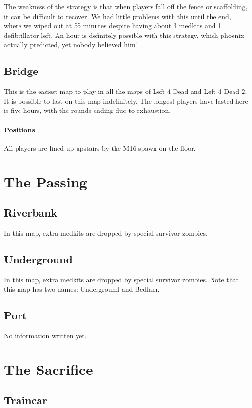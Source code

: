 The weakness of the strategy is that when players fall off the fence or scaffolding, it can be difficult to recover. We had little problems with this until the end, where we wiped out at 55 minutes despite having about 3 medkits and 1 defibrillator left. An hour is definitely possible with this strategy, which phoenix actually predicted, yet nobody believed him!

\subsection{Bridge}
This is the easiest map to play in all the maps of Left 4 Dead and Left 4 Dead 2. It is possible to last on this map indefinitely. The longest players have lasted here is five hours, with the rounds ending due to exhaustion.
\paragraph{Positions}
All players are lined up upstairs by the M16 spawn on the floor.

\section{The Passing}

\subsection{Riverbank}
In this map, extra medkits are dropped by special survivor zombies.

\subsection{Underground}
In this map, extra medkits are dropped by special survivor zombies. Note that this map has two names: Underground and Bedlam.

\subsection{Port}
No information written yet.

\section{The Sacrifice}

\subsection{Traincar}
